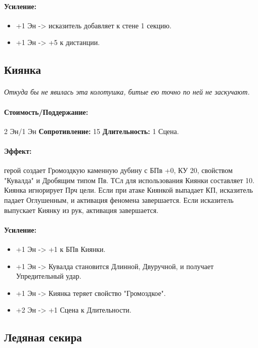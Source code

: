\begin{itemize}
\begin{itemize}
\paragraph{Усиление:}
\begin{itemize}
\item+1 Эн -> исказитель добавляет к стене 1 секцию.
\item+1 Эн -> +5 к дистанции.
\end{itemize}
\subsection{Киянка}
\paragraph{} 
\textit{Откуда бы не явилась эта колотушка, битые ею точно по ней не заскучают.}
\paragraph{Стоимость/Поддержание: }2 Эн/1 Эн
\newline
\textbf{Сопротивление: }15
\newline 
\textbf{Длительность: }1 Сцена.
\paragraph{Эффект: }герой создает Громоздкую каменную дубину с БПв +0, КУ 20, свойством "Кувалда" и Дробящим типом Пв. ТСл для использования Киянки составляет 10. Киянка игнорирует Прч цели. 
\newline Если при атаке Киянкой выпадает КП, исказитель падает Оглушенным, и активация феномена завершается. Если исказитель выпускает Киянку из рук, активация завершается.
\paragraph{Усиление:}
\begin{itemize}
\item+1 Эн -> +1 к БПв Киянки.
\item+1 Эн -> Кувалда становится Длинной, Двуручной, и получает Упредительный удар.
\item+1 Эн -> Киянка теряет свойство "Громоздкое".
\item+2 Эн -> +1 Сцена к Длительности.
\end{itemize}
\subsection{Ледяная секира}

\end{itemize}
\end{itemize}

